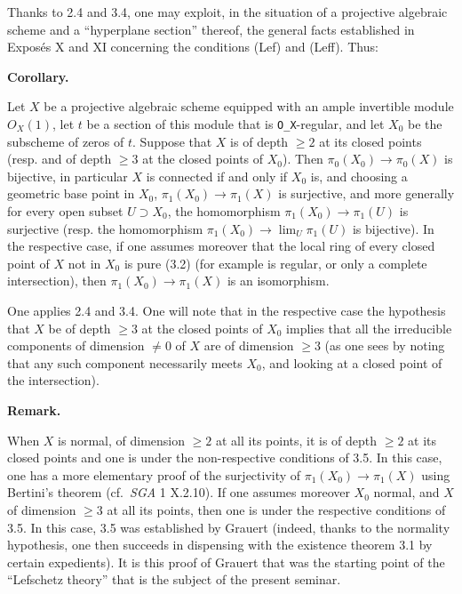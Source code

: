 \documentclass[
]{article}
\begin{document}
Thanks to 2.4 and 3.4, one may exploit, in the situation of a projective
algebraic scheme and a ``hyperplane section'' thereof, the general facts
established in Exposés X and XI concerning the conditions (Lef) and
(Leff). Thus:

\textbf{Corollary.}

Let \(X\) be a projective algebraic scheme equipped with an ample
invertible module \(O_{X}(1)\), let \(t\) be a section of this module
that is \texttt{O\_X}-regular, and let \(X_{0}\) be the subscheme of
zeros of \(t\). Suppose that \(X\) is of depth \(\geqslant 2\) at its
closed points (resp. and of depth \(\geqslant 3\) at the closed points
of \(X_{0}\)). Then \(\pi_{0}(X_{0}) \to \pi_{0}(X)\) is bijective, in
particular \(X\) is connected if and only if \(X_{0}\) is, and choosing
a geometric base point in \(X_{0}\), \(\pi_{1}(X_{0}) \to \pi_{1}(X)\)
is surjective, and more generally for every open subset
\(U \supset X_{0}\), the homomorphism \(\pi_{1}(X_{0}) \to \pi_{1}(U)\)
is surjective (resp. the homomorphism
\(\pi_{1}(X_{0}) \to \lim_{U} \pi_{1}(U)\) is bijective). In the
respective case, if one assumes moreover that the local ring of every
closed point of \(X\) not in \(X_{0}\) is pure (3.2) (for example is
regular, or only a complete intersection), then
\(\pi_{1}(X_{0}) \to \pi_{1}(X)\) is an isomorphism.

One applies 2.4 and 3.4. One will note that in the respective case the
hypothesis that \(X\) be of depth \(\geqslant 3\) at the closed points
of \(X_{0}\) implies that all the irreducible components of dimension
\(\neq 0\) of \(X\) are of dimension \(\geqslant 3\) (as one sees by
noting that any such component necessarily meets \(X_{0}\), and looking
at a closed point of the intersection).

\textbf{Remark.}

When \(X\) is normal, of dimension \(\geqslant 2\) at all its points, it
is of depth \(\geqslant 2\) at its closed points and one is under the
non-respective conditions of 3.5. In this case, one has a more
elementary proof of the surjectivity of
\(\pi_{1}(X_{0}) \to \pi_{1}(X)\) using Bertini's theorem
(cf.~\emph{SGA} 1 X.2.10). If one assumes moreover \(X_{0}\) normal, and
\(X\) of dimension \(\geqslant 3\) at all its points, then one is under
the respective conditions of 3.5. In this case, 3.5 was established by
Grauert (indeed, thanks to the normality hypothesis, one then succeeds
in dispensing with the existence theorem 3.1 by certain expedients). It
is this proof of Grauert that was the starting point of the ``Lefschetz
theory'' that is the subject of the present seminar.
\end{document}
